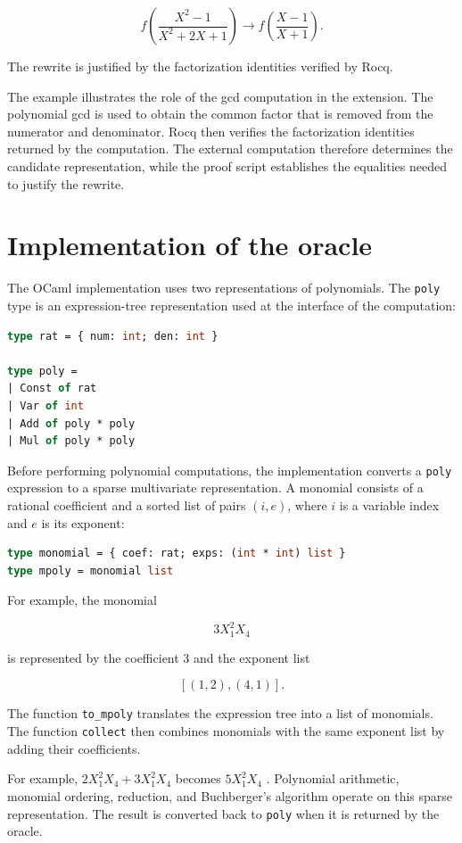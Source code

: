 \documentclass[11pt]{article}
\begin{document}
$$
f\left(\frac{X^2-1}{X^2+2X+1}\right)
\longrightarrow
f\left(\frac{X-1}{X+1}\right).
$$

The rewrite is justified by the factorization identities verified by Rocq.


The example illustrates the role of the gcd computation in the extension.
The polynomial gcd is used to obtain the common factor that is removed from
the numerator and denominator. Rocq then verifies the factorization
identities returned by the computation. The external computation therefore
determines the candidate representation, while the proof script establishes
the equalities needed to justify the rewrite.
\newpage
\section{Implementation of the oracle}
The OCaml implementation uses two representations of polynomials. The
\texttt{poly} type is an expression-tree representation used at the interface
of the computation:

\begin{lstlisting}[language=ML]
type rat = { num: int; den: int }

type poly =
| Const of rat
| Var of int
| Add of poly * poly
| Mul of poly * poly
\end{lstlisting}

Before performing polynomial computations, the implementation converts a
\texttt{poly} expression to a sparse multivariate representation. A monomial
consists of a rational coefficient and a sorted list of pairs $(i,e)$, where
$i$ is a variable index and $e$ is its exponent:

\begin{lstlisting}[language=ML]
type monomial = { coef: rat; exps: (int * int) list }
type mpoly = monomial list
\end{lstlisting}

For example, the monomial

$$
  3X_1^2X_4
$$

is represented by the coefficient $3$ and the exponent list

$$
  [(1,2),(4,1)].
$$

The function \texttt{to\_mpoly} translates the expression tree into a list of monomials. The function \texttt{collect} then combines monomials with the same exponent list by adding their coefficients.

For example, $2X_1^2X_4 + 3X_1^2X_4$ becomes $5X_1^2X_4$ .
Polynomial arithmetic, monomial ordering, reduction, and Buchberger's
algorithm operate on this sparse representation. The result is converted back
to \texttt{poly} when it is returned by the oracle.
\end{document}
